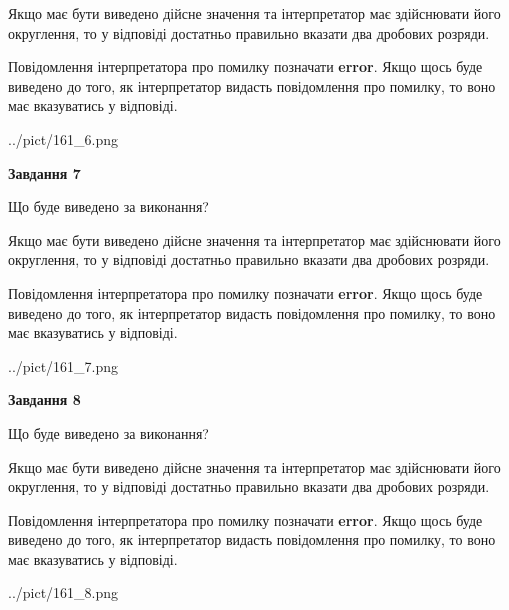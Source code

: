 \documentclass[12pt, ukrainian]{article}
\begin{document}
{\begin {Large}
Якщо має бути виведено дійсне значення та інтерпретатор має здійснювати його округлення, 
то у відповіді достатньо правильно вказати два дробових розряди.

Повідомлення інтерпретатора про помилку позначати \textbf{error}.
Якщо щось буде виведено до того, як інтерпретатор видасть повідомлення про помилку, 
то воно має вказуватись у відповіді. \par

\begin{center}
	{../pict/161_6.png}
\end{center}
\newpage

{\begin {center}\textbf{Завдання 7}\end {center}}\par
Що буде виведено за виконання? \par

Якщо має бути виведено дійсне значення та інтерпретатор має здійснювати його округлення, 
то у відповіді достатньо правильно вказати два дробових розряди.

Повідомлення інтерпретатора про помилку позначати \textbf{error}.
Якщо щось буде виведено до того, як інтерпретатор видасть повідомлення про помилку, 
то воно має вказуватись у відповіді. \par

\begin{center}
	{../pict/161_7.png}
\end{center}
\newpage

{\begin {center}\textbf{Завдання 8}\end {center}}\par
Що буде виведено за виконання? \par

Якщо має бути виведено дійсне значення та інтерпретатор має здійснювати його округлення, 
то у відповіді достатньо правильно вказати два дробових розряди.

Повідомлення інтерпретатора про помилку позначати \textbf{error}.
Якщо щось буде виведено до того, як інтерпретатор видасть повідомлення про помилку, 
то воно має вказуватись у відповіді. \par

\begin{center}
	{../pict/161_8.png}
\end{center}
\newpage


\end{Large}}
\end{document}
